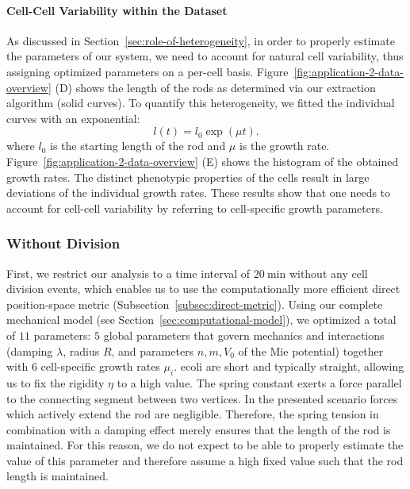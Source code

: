 \paragraph{Cell-Cell Variability within the Dataset}
\label{paragraph:parameter-estimation-individual-treatment}

As discussed in Section~\ref{sec:role-of-heterogeneity}, in order to properly estimate the
parameters of our system, we need to account for natural cell variability, thus assigning optimized
parameters on a per-cell basis.
Figure~\ref{fig:application-2-data-overview} (D) shows the length of the rods as determined via our
extraction algorithm (solid curves).
To quantify this heterogeneity, we fitted the individual curves with an exponential:
\begin{equation}
    l(t) = l_0 \exp(\mu t).
    \label{eq:exponential-growth-model}
\end{equation}
where $l_0$ is the starting length of the rod and $\mu$ is the growth rate.
Figure~\ref{fig:application-2-data-overview} (E) shows the histogram of the obtained growth rates.
The distinct phenotypic properties of the cells result in large deviations of the individual growth
rates.
These results show that one needs to account for cell-cell variability by referring to cell-specific
growth parameters.

\subsubsection{Without Division}
\label{sec:application-1-without-division}
First, we restrict our analysis to a time interval of $\SI{20}{\minute}$ without any cell division
events, which enables us to use the computationally more efficient direct position-space metric
(Subsection~\ref{subsec:direct-metric}).
Using our complete mechanical model (see Section~\ref{sec:computational-model}), we optimized a
total of $11$ parameters: $5$ global parameters that govern mechanics and interactions (damping
$\lambda$, radius $R$, and parameters $n,m,V_0$ of the Mie potential) together with $6$
cell-specific growth rates $\mu_i$.
\ac{ecoli} are short and typically straight, allowing us to fix the rigidity $\eta$ to a high value.
The spring constant exerts a force parallel to the connecting segment between two vertices.
In the presented scenario forces which actively extend the rod are negligible.
Therefore, the spring tension in combination with a damping effect merely ensures that the length of
the rod is maintained.
For this reason, we do not expect to be able to properly estimate the value of this parameter and
therefore assume a high fixed value such that the rod length is maintained.

